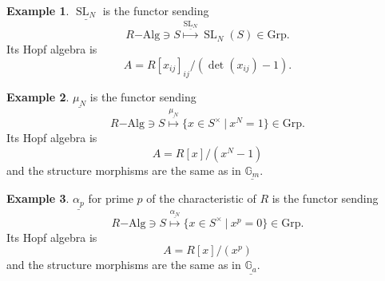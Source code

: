 \documentclass[10pt]{article}
\numberwithin{equation}{section}
\theoremstyle{definition}
\newtheorem{example}{Example}[section]
\DeclareMathOperator{\SL}{SL}
\newcommand{\sep}[0]{\:|\:}
\newcommand{\Grp}[0]{\mathrm{Grp}}
\begin{document}
\begin{example}
    $\underline{\SL_N}$ is the functor sending 
    \begin{equation*}
        R\mathrm{-Alg}\ni S\stackrel{\underline{\SL_N}}{\mapsto}\SL_N(S)\in\Grp.
    \end{equation*}
    Its Hopf algebra is 
    \begin{equation*}
        A = R[x_{ij}]_{ij}/(\det(x_{ij})-1).
    \end{equation*}
\end{example}
\begin{example}
    $\underline{\mu_N}$ is the functor sending 
    \begin{equation*}
        R\mathrm{-Alg}\ni S\stackrel{\underline{\mu_N}}{\mapsto}\{x\in S^\times\sep x^N=1\}\in\Grp.
    \end{equation*}
    Its Hopf algebra is 
    \begin{equation*}
        A = R[x]/(x^N-1)
    \end{equation*}
    and the structure morphisms are the same as in $\underline{\mathbb{G}_m}$.
\end{example}
\begin{example}
    $\underline{\alpha_p}$ for prime $p$ of the characteristic of $R$ is the functor sending 
    \begin{equation*}
        R\mathrm{-Alg}\ni S\stackrel{\underline{\alpha_N}}{\mapsto}\{x\in S^\times\sep x^p=0\}\in\Grp.
    \end{equation*}
    Its Hopf algebra is 
    \begin{equation*}
        A = R[x]/(x^p)
    \end{equation*}
    and the structure morphisms are the same as in $\underline{\mathbb{G}_a}$.
\end{example}
\end{document}
